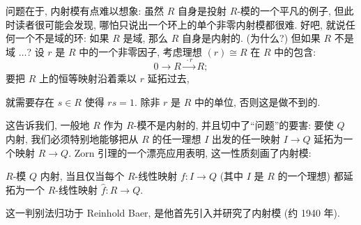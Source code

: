 问题在于, 内射模有点难以想象: 虽然 $R$ 自身是投射 $R$-模的一个平凡的例子, 但此时读者很可能会发现, 哪怕只说出一个环上的单个非零内射模都很难. 好吧, 就说任何一个不是域的环: 如果 $R$ 是域, 那么 $R$ 自身是内射的. (为什么?) 但如果 $R$ 不是域 $\dots$? 设 $r$ 是 $R$ 中的一个非零因子, 考虑理想 $(r)\cong R$ 在 $R$ 中的包含:
\[
0\longrightarrow R\xrightarrow{\ \cdot r\ }R;
\]
要把 $R$ 上的恒等映射沿着乘以 $r$ 延拓过去,
\begin{center}
\end{center}
就需要存在 $s\in R$ 使得 $rs=1$. 除非 $r$ 是 $R$ 中的单位, 否则这是做不到的.

这告诉我们, 一般地 $R$ 作为 $R$-模不是内射的, 并且切中了``问题''的要害: 要使 $Q$ 内射, 我们必须特别地能够把从 $R$ 的任一理想 $I$ 出发的任一映射 $I\to Q$ 延拓为一个映射 $R\to Q$. Zorn 引理的一个漂亮应用表明, 这一性质刻画了内射模:

\begin{theorem}\label{thm:baer-criterion}
$R$-模 $Q$ 内射, 当且仅当每个 $R$-线性映射 $f:I\to Q$ (其中 $I$ 是 $R$ 的一个理想) 都延拓为一个 $R$-线性映射 $\hat{f}:R\to Q$.
\end{theorem}

这一判别法归功于 Reinhold Baer, 是他首先引入并研究了内射模 (约 1940 年).

